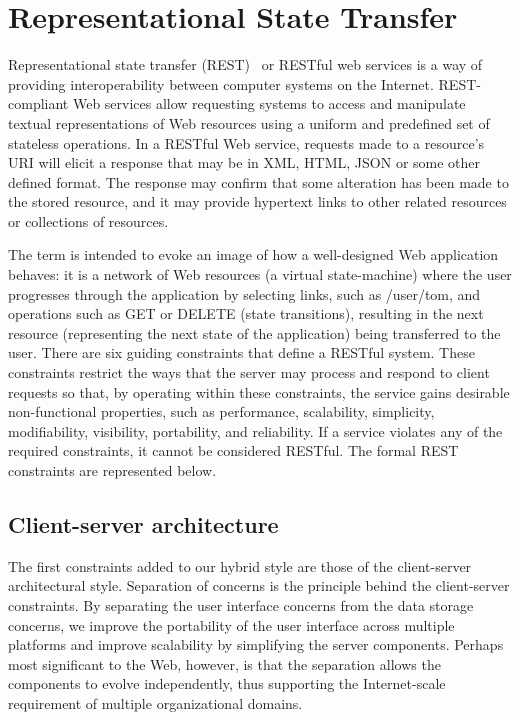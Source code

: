 \section{Representational State Transfer}
\label{rest}
Representational state transfer (REST)~\cite{w3c2004web} or RESTful web services is a way of providing interoperability between computer systems on the Internet. REST-compliant Web services allow requesting systems to access and manipulate textual representations of Web resources using a uniform and predefined set of stateless operations.  In a RESTful Web service, requests made to a resource's URI will elicit a response that may be in XML, HTML, JSON or some other defined format. The response may confirm that some alteration has been made to the stored resource, and it may provide hypertext links to other related resources or collections of resources.\par  		The term is intended to evoke an image of how a well-designed Web application behaves: it is a network of Web resources (a virtual state-machine) where the user progresses through the application by selecting links, such as /user/tom, and operations such as GET or DELETE (state transitions), resulting in the next resource (representing the next state of the application) being transferred to the user. There are six guiding constraints that define a RESTful system. These constraints restrict the ways that the server may process and respond to client requests so that, by operating within these constraints, the service gains desirable non-functional properties, such as performance, scalability, simplicity, modifiability, visibility, portability, and reliability. If a service violates any of the required constraints, it cannot be considered RESTful. The formal REST constraints are represented below.

\subsection{Client-server architecture}
The first constraints added to our hybrid style are those of the client-server architectural style. Separation of concerns is the principle behind the client-server constraints. By separating the user interface concerns from the data storage concerns, we improve the portability of the user interface across multiple platforms and improve scalability by simplifying the server components. Perhaps most significant to the Web, however, is that the separation allows the components to evolve independently, thus supporting the Internet-scale requirement of multiple organizational domains.

